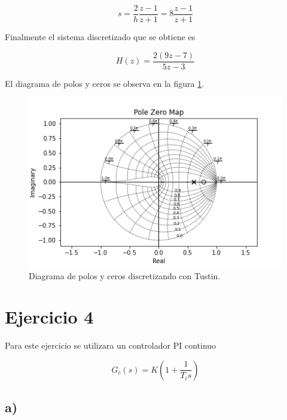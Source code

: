 \documentclass{article}
\begin{document}
        \begin{equation}
            s = \frac{ 2 }{h} \frac{z - 1}{z + 1} = 8 \frac{z - 1}{z + 1}
        \end{equation}

        Finalmente el sistema discretizado que se obtiene es 

        \begin{equation}
            H(z) = \frac{2( 9z - 7 )}{5z - 3}
        \end{equation}

        El diagrama de polos y ceros se observa en la figura \ref{fig:3-tustin}.

        \begin{figure}[!htb]
            \centering
            \includegraphics[width=\textwidth]{Img/3-tustin.png}
            \caption{Diagrama de polos y ceros discretizando con Tustin.}
            \label{fig:3-tustin}
        \end{figure}

    \section{Ejercicio 4}

    Para este ejercicio se utilizara un controlador PI continuo

    \begin{equation}
        G_c(s) = K\left( 1 + \frac{1}{T_i s} \right)
    \end{equation}

    \subsection{a)}
\end{document}
